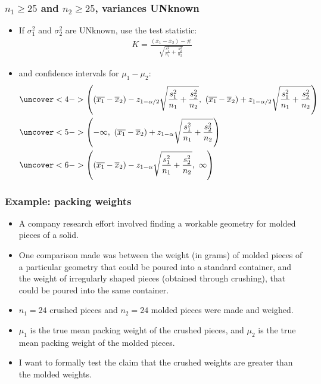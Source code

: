 \documentclass[handout]{beamer}\usepackage{graphicx, color}
\providecommand{\ov}[1]{\overline{#1}}
\numberwithin{equation}{section}
\begin{document}
\begin{frame}
\frametitle{$n_1 \ge 25$ and $n_2 \ge 25$, variances UNknown} \scriptsize
\begin{itemize}
\item If $\sigma^2_1$ and $\sigma_2^2$ are UNknown, use the test statistic:
\pause \begin{align*}
K = \frac{(\ov{x}_1 - \ov{x}_2) - \#}{\sqrt{\frac{s^2_1}{n_1} + \frac{s^2_2}{n_2}}}
\end{align*}
\pause \item and confidence intervals for $\mu_1 - \mu_2$:
\begin{align*}
&\uncover<4->{\left ((\ov{x_1} - \ov{x}_2) - z_{1 - \alpha/2} \sqrt{\frac{s^2_1}{n_1} + \frac{s^2_2}{n_2}} , \ (\ov{x_1} - \ov{x}_2) + z_{1 - \alpha/2} \sqrt{\frac{s^2_1}{n_1} + \frac{s^2_2}{n_2}} \right )} \\
&\uncover<5->{\left (-\infty , \ (\ov{x_1} - \ov{x}_2) + z_{1 - \alpha} \sqrt{\frac{s^2_1}{n_1} + \frac{s^2_2}{n_2}} \right )} \\
&\uncover<6->{\left ((\ov{x_1} - \ov{x}_2) - z_{1 - \alpha} \sqrt{\frac{s^2_1}{n_1} + \frac{s^2_2}{n_2}}, \ \infty \right )} 
\end{align*}
\end{itemize}
\end{frame}

\begin{frame}
\frametitle{Example: packing weights}
\begin{itemize}
\item A company research effort involved finding a workable geometry for molded pieces of a solid. 
\pause \item One comparison made was between the weight (in grams) of molded pieces of a particular geometry that could be poured into a standard container, and the weight of irregularly shaped pieces (obtained through crushing), that could be poured into the same container. 
\pause \item $n_1 = 24$ crushed pieces and $n_2 = 24$ molded pieces were made and weighed.
\pause \item $\mu_1$ is the true mean packing weight of the crushed pieces, and $\mu_2$ is the true mean packing weight of the molded pieces.
\pause \item I want to formally test the claim that the crushed weights are greater than the molded weights.
\end{itemize}
\end{frame}
\end{document}
